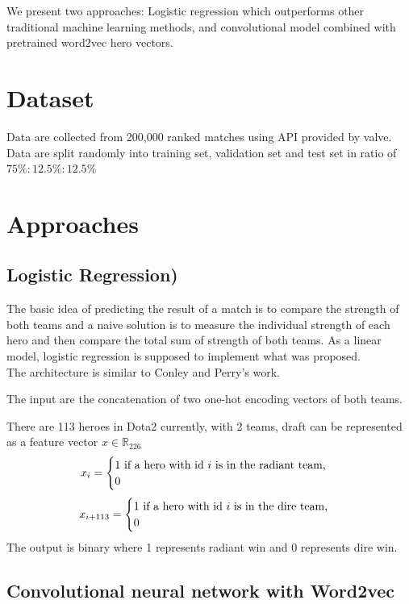 \documentclass[a4paper, 10pt, conference]{ieeeconf}
\begin{document}
We present two approaches: Logistic regression which outperforms other traditional machine learning methods, and convolutional model combined with pretrained word2vec hero vectors.

\section{Dataset}

Data are collected from 200,000 ranked matches using API provided by valve. Data are split randomly into training set, validation set and test set in ratio of $75\%:12.5\%:12.5\%$


\section{Approaches}

\subsection{Logistic Regression)}

The basic idea of predicting the result of a match is to compare the strength of both teams and a naive solution is to measure the individual strength of each hero and then compare the total sum of strength of both teams. As a linear model, logistic regression is supposed to implement what was proposed.\\

The architecture is similar to Conley and Perry's\cite{conley2013does} work.

The input are the concatenation of two one-hot encoding vectors of both teams.

There are 113 heroes in Dota2 currently, with 2 teams, draft can be represented as a feature vector $x\in\mathbb{R}_{226}$
\[
	x_{i}=\begin{cases}
			1 $ if a hero with id $i$ is in the radiant team,$\\
			0
	    \end{cases}
\]	
\[
	x_{i+113}=\begin{cases}
			1 $ if a hero with id $i$ is in the dire team,$\\
			0
	    \end{cases}
\]	
The output is binary where 1 represents radiant win and 0 represents dire win.\\

\subsection{Convolutional neural network with Word2vec}
\end{document}
